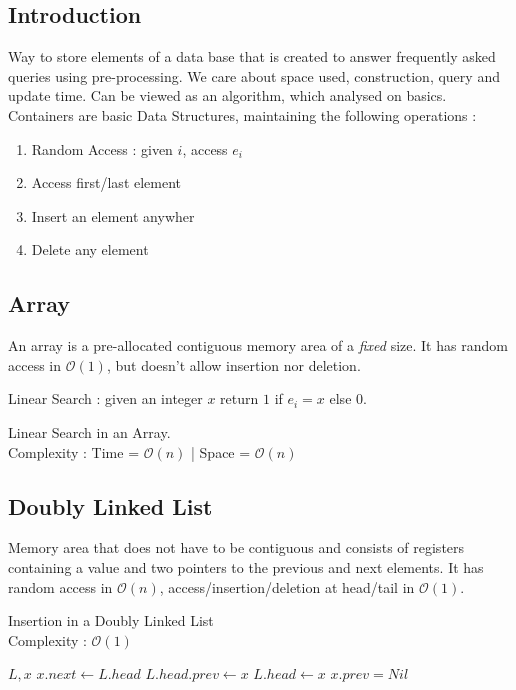 \documentclass[12pt]{cours}
\begin{document}
\subsection{Introduction}
Way to store elements of a data base that is created to answer frequently asked queries using pre-processing.
We care about space used, construction, query and update time.
Can be viewed as an algorithm, which analysed on basics.
Containers are basic Data Structures, maintaining the following operations :
\begin{enumerate}
    \item Random Access : given $i$, access $e_{i}$
    \item Access first/last element
    \item Insert an element anywher
    \item Delete any element
\end{enumerate}

\subsection{Array}
An array is a pre-allocated contiguous memory area of a \emph{fixed} size. It has random access in $\mathcal{O}(1)$, but doesn't allow insertion nor deletion.

Linear Search : given an integer $x$ return $1$ if $e_{i} = x$ else 0.
\begin{algorithm}
    \caption{Linear Search in an Array. \\ Complexity : Time = $\mathcal{O}(n)$ | Space = $\mathcal{O}(n)$}
\end{algorithm}

\subsection{Doubly Linked List}
Memory area that does not have to be contiguous and consists of registers containing a value and two pointers to the previous and next elements.
It has random access in $\mathcal{O}(n)$, access/insertion/deletion at head/tail in $\mathcal{O}(1)$.
\begin{algorithm}
    \caption{Insertion in a Doubly Linked List \\ Complexity : $\mathcal{O}(1)$}
    \begin{algorithmic}
        \Input
        $ L, x$
        \EndInput
        \State $x.next \gets L.head$
        \State $L.head.prev \gets x$
        \EndIf
        \State $L.head \gets x$
        \State $x.prev = Nil$
    \end{algorithmic}
\end{algorithm}
\end{document}
